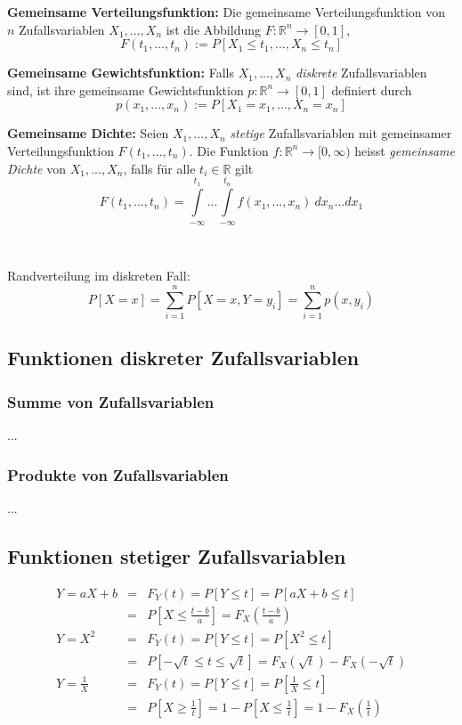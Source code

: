 \documentclass[10pt,a4paper,twocolumn]{article}
\begin{document}
\textbf{Gemeinsame Verteilungsfunktion:} Die gemeinsame Verteilungsfunktion von $n$ Zufallsvariablen $X_1,...,X_n$ ist die Abbildung $F:\mathbb{R}^n\rightarrow [0,1]$,
\[
F(t_1,...,t_n):=P[X_1\leq t_1,...,X_n\leq t_n]
\]

\textbf{Gemeinsame Gewichtsfunktion:} Falls $X_1,...,X_n$ \emph{diskrete} Zufallsvariablen sind, ist ihre gemeinsame Gewichtsfunktion $p:\mathbb{R}^n\rightarrow [0,1]$ definiert durch
\[
p(x_1,...,x_n):=P[X_1=x_1,...,X_n=x_n]
\]

\textbf{Gemeinsame Dichte:} Seien $X_1,...,X_n$ \emph{stetige} Zufallsvariablen mit gemeinsamer Verteilungsfunktion $F(t_1,...,t_n)$. Die Funktion $f:\mathbb{R}^n\rightarrow [0,\infty)$ heisst \emph{gemeinsame Dichte} von $X_1,...,X_n$, falls für alle $t_i\in\mathbb{R}$ gilt
\[
F(t_1,...,t_n)=\int\limits_{-\infty}^{t_1}...\int\limits_{-\infty}^{t_n}f(x_1,...,x_n)\ dx_n...dx_1
\]

\

Randverteilung im diskreten Fall:
\[
P[X=x]=\sum\limits_{i=1}^{n}P[X=x,Y=y_i]=\sum\limits_{i=1}^{n}p(x,y_i)
\]

\subsection{Funktionen diskreter Zufallsvariablen}

\subsubsection{Summe von Zufallsvariablen}
...

\subsubsection{Produkte von Zufallsvariablen}
...

\subsection{Funktionen stetiger Zufallsvariablen}
\[
\begin{array}{rcl}
	Y=aX+b & = & F_Y(t)=P[Y\leq t]=P[aX+b\leq t] \\
	& = & P[X\leq \frac{t-b}{a}]=F_X(\frac{t-b}{a}) \\
	Y=X^2 & = & F_Y(t)=P[Y\leq t]=P[X^2\leq t] \\
	& = & P[-\sqrt{t}\leq t\leq\sqrt{t}]=F_X(\sqrt{t})-F_X(-\sqrt{t}) \\
	Y=\frac{1}{X} & = & F_Y(t)=P[Y\leq t]=P[\frac{1}{X}\leq t] \\
	& = & P[X\geq\frac{1}{t}]=1-P[X\leq\frac{1}{t}]=1-F_X(\frac{1}{t})
\end{array}
\]
\end{document}
